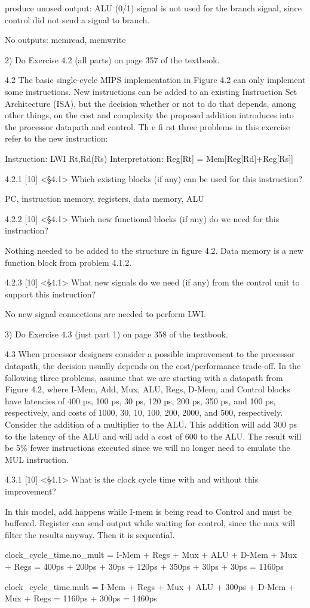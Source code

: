 produce unused output:
ALU (0/1) signal is not used for the branch signal, since control did not send a signal to branch.

No outputs:
memread, memwrite


2) Do Exercise 4.2 (all parts) on page 357 of the textbook.

4.2 The basic single-cycle MIPS implementation in Figure 4.2 can only implement some instructions. New instructions can be added to an existing Instruction Set Architecture (ISA), but the decision whether or not to do that depends, among other things, on the cost and complexity the proposed addition introduces into the processor datapath and control. Th e fi rst three problems in this exercise refer to the new instruction:

Instruction: LWI Rt,Rd(Rs)
Interpretation: Reg[Rt] = Mem[Reg[Rd]+Reg[Rs]]

4.2.1 [10] <§4.1> Which existing blocks (if any) can be used for this instruction?

PC, instruction memory, registers, data memory, ALU

4.2.2 [10] <§4.1> Which new functional blocks (if any) do we need for this instruction?

Nothing needed to be added to the structure in figure 4.2. Data memory is a new function block from problem 4.1.2.

4.2.3 [10] <§4.1> What new signals do we need (if any) from the control unit to support this instruction?

No new signal connections are needed to perform LWI.


3) Do Exercise 4.3 (just part 1) on page 358 of the textbook.

4.3 When processor designers consider a possible improvement to the processor datapath, the decision usually depends on the cost/performance trade-off. In the following three problems, assume that we are starting with a datapath from Figure 4.2, where I-Mem, Add, Mux, ALU, Regs, D-Mem, and Control blocks have latencies of 400 ps, 100 ps, 30 ps, 120 ps, 200 ps, 350 ps, and 100 ps, respectively, and costs of 1000, 30, 10, 100, 200, 2000, and 500, respectively. Consider the addition of a multiplier to the ALU. This addition will add 300 ps to the latency of the ALU and will add a cost of 600 to the ALU. The result will be 5\% fewer instructions executed since we will no longer need to emulate the MUL instruction.

4.3.1 [10] <§4.1> What is the clock cycle time with and without this improvement?

In this model, add happens while I-mem is being read to Control and must be buffered. Register can send output while waiting for control, since the mux will filter the results anyway. Then it is sequential.

clock_cycle_time.no_mult = I-Mem + Regs + Mux + ALU + D-Mem + Mux + Regs =  400ps + 200ps + 30ps + 120ps + 350ps + 30ps + 30ps = 1160ps

clock_cycle_time.mult = I-Mem + Regs + Mux + ALU + 300ps + D-Mem + Mux + Regs = 1160ps + 300ps = 1460ps

